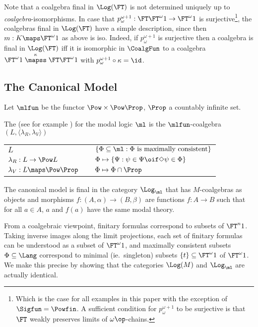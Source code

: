 \documentclass{entcs}
\begin{document}
\begin{remark}\label{rem:p-surjective}
  Note that a coalgebra final in $\Log(\FT)$ is not determined uniquely up
  to \emph{coalgebra}-isomorphisms. In case that
  $p^{\omega+1}_\omega:\FT\FT^\omega 1\to \FT^\omega 1$ is
  surjective\footnote{Which is the case for all examples in this paper with
    the exception of $\Sigfun=\Powfin$. A sufficient condition for
    $p^{\omega+1}_\omega$ to be surjective is that $\FT$ weakly preserves
  limits of $\omega\op$-chains.}, %
the coalgebras final in $\Log(\FT)$ have a simple description, since then
$m:K\maps \FT^\omega 1$ as above is iso.
Indeed, if $p^{\omega+1}_\omega$ is surjective then a coalgebra is final in
$\Log(\FT)$ iff it is isomorphic in $\CoalgFun$ to a coalgebra
$\FT^\omega 1\stackrel{\kappa}{\mapss}{\FT\FT^\omega 1}$ with
$p^{\omega+1}_\omega\circ\kappa=\id$.
\end{remark}





\subsection{The Canonical Model}

Let $\mlfun$ be the functor $\Pow\times\Pow\Prop$, $\Prop$ a countably infinite
set.

\pskip The  (see for example
\cite{brv,goldblatt:ltc})
for the modal logic $\ml$ is the
$\mlfun$-coalgebra $(L,\langle \lambda_R,\lambda_V\rangle)$
%
{\renewcommand{\arraystretch}{1.2}
\begin{center}
\begin{tabular}{lll}
$L$ & & $\{\Phi\subseteq\ml: \Phi \text{ is maximally consistent}\}$\\
$\lambda_R:L\to\Pow L$ & &
$\Phi\mapsto\{\Psi:\psi\in\Psi\oif\Diamond\psi\in\Phi\}$\\
$\lambda_V:L\maps\Pow\Prop$ && $\Phi\mapsto\Phi\cap\Prop$
\end{tabular}
\end{center}
}
%
\noindent
The canonical model is final in the category $\Log_\ml$ that has
$M$-coalgebras as objects and morphisms $f:(A,\alpha)\to(B,\beta)$ are
functions $f:A\to B$ such that for all $a\in A$, $a$ and $f(a)$ have the same
modal theory.%


From a coalgebraic viewpoint, finitary formulas correspond to subsets
of $\FT^{n} 1$. Taking inverse images along the limit projections,
each set of finitary formulas can be understood as a subset of
$\FT^{\omega} 1$, and maximally consistent subsets $\Phi \subseteq
\Lang$ correspond to minimal (ie.\  singleton) subsets $\lbrace t
\rbrace \subseteq \FT^{\omega} 1$ of $\FT^{\omega} 1$. We make this
precise by showing that the categories $\Log(M)$ and $\Log_\ml$ are
actually identical.
\end{document}
